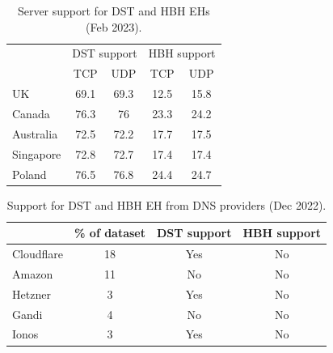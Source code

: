 \documentclass[conference]{IEEEtran}
\begin{document}
\begin{table} 
\centering
\caption{Server support for DST and HBH EHs (Feb 2023). }
\begin{tabular}{p{1.5cm}|cc|cc}
\multicolumn{1}{l|}{} & \multicolumn{2}{p{2cm}|}{\centering DST support} 
                      & \multicolumn{2}{p{2cm}}{\centering HBH support} \\ \cline{2-5} 
\multicolumn{1}{l|}{} & \multicolumn{1}{c|}{TCP}   & UDP      & \multicolumn{1}{c|}{TCP}     & UDP   \\ \hline \hline
UK                    & \multicolumn{1}{c|}{69.1}  & 69.3     & \multicolumn{1}{c|}{12.5}    & 15.8  \\ \hline
Canada                & \multicolumn{1}{c|}{76.3}  & 76       & \multicolumn{1}{c|}{23.3}    & 24.2  \\ \hline
Australia             & \multicolumn{1}{c|}{72.5}  & 72.2     & \multicolumn{1}{c|}{17.7}    & 17.5  \\ \hline
Singapore             & \multicolumn{1}{c|}{72.8}  & 72.7     & \multicolumn{1}{c|}{17.4}    & 17.4  \\ \hline
Poland                & \multicolumn{1}{c|}{76.5}  & 76.8     & \multicolumn{1}{c|}{24.4}    & 24.7   
\end{tabular}
\label{tbl:e2e_traversal}
\end{table}


\begin{table} 
\centering
\caption{Support for DST and HBH EH from DNS providers (Dec 2022).}
\begin{tabular}{l|c|c|c}
           & \% of dataset &  DST support & HBH support\\
\hline \hline
Cloudflare & 18   & Yes  & No                 \\
\hline
Amazon     & 11   & No   & No                 \\
\hline
Hetzner    & 3    & Yes  & No                 \\
\hline
Gandi      & 4    & No   & No                 \\
\hline
Ionos      & 3    & Yes  & No                
\end{tabular}
\label{tbl:provider_support}
\end{table}
\end{document}
